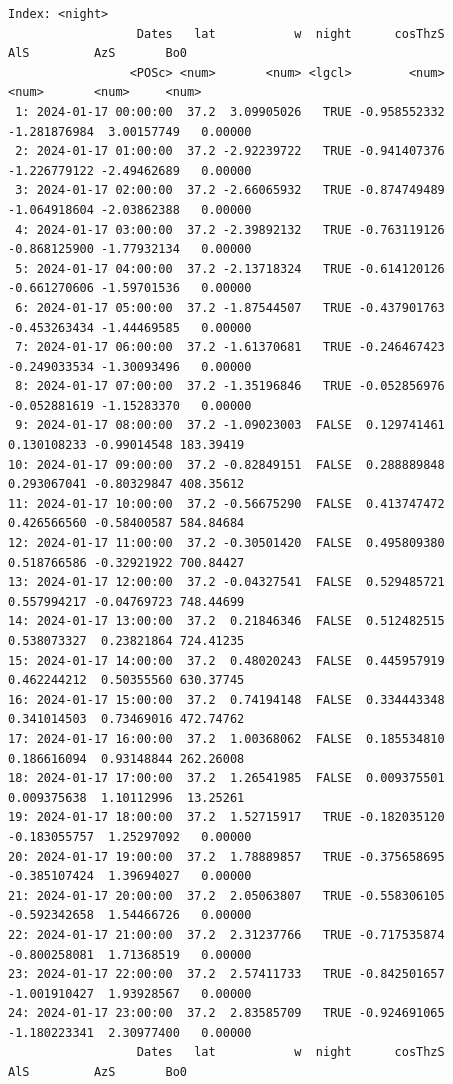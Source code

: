 \begin{verbatim}
Index: <night>
                  Dates   lat           w  night      cosThzS          AlS         AzS       Bo0
                 <POSc> <num>       <num> <lgcl>        <num>        <num>       <num>     <num>
 1: 2024-01-17 00:00:00  37.2  3.09905026   TRUE -0.958552332 -1.281876984  3.00157749   0.00000
 2: 2024-01-17 01:00:00  37.2 -2.92239722   TRUE -0.941407376 -1.226779122 -2.49462689   0.00000
 3: 2024-01-17 02:00:00  37.2 -2.66065932   TRUE -0.874749489 -1.064918604 -2.03862388   0.00000
 4: 2024-01-17 03:00:00  37.2 -2.39892132   TRUE -0.763119126 -0.868125900 -1.77932134   0.00000
 5: 2024-01-17 04:00:00  37.2 -2.13718324   TRUE -0.614120126 -0.661270606 -1.59701536   0.00000
 6: 2024-01-17 05:00:00  37.2 -1.87544507   TRUE -0.437901763 -0.453263434 -1.44469585   0.00000
 7: 2024-01-17 06:00:00  37.2 -1.61370681   TRUE -0.246467423 -0.249033534 -1.30093496   0.00000
 8: 2024-01-17 07:00:00  37.2 -1.35196846   TRUE -0.052856976 -0.052881619 -1.15283370   0.00000
 9: 2024-01-17 08:00:00  37.2 -1.09023003  FALSE  0.129741461  0.130108233 -0.99014548 183.39419
10: 2024-01-17 09:00:00  37.2 -0.82849151  FALSE  0.288889848  0.293067041 -0.80329847 408.35612
11: 2024-01-17 10:00:00  37.2 -0.56675290  FALSE  0.413747472  0.426566560 -0.58400587 584.84684
12: 2024-01-17 11:00:00  37.2 -0.30501420  FALSE  0.495809380  0.518766586 -0.32921922 700.84427
13: 2024-01-17 12:00:00  37.2 -0.04327541  FALSE  0.529485721  0.557994217 -0.04769723 748.44699
14: 2024-01-17 13:00:00  37.2  0.21846346  FALSE  0.512482515  0.538073327  0.23821864 724.41235
15: 2024-01-17 14:00:00  37.2  0.48020243  FALSE  0.445957919  0.462244212  0.50355560 630.37745
16: 2024-01-17 15:00:00  37.2  0.74194148  FALSE  0.334443348  0.341014503  0.73469016 472.74762
17: 2024-01-17 16:00:00  37.2  1.00368062  FALSE  0.185534810  0.186616094  0.93148844 262.26008
18: 2024-01-17 17:00:00  37.2  1.26541985  FALSE  0.009375501  0.009375638  1.10112996  13.25261
19: 2024-01-17 18:00:00  37.2  1.52715917   TRUE -0.182035120 -0.183055757  1.25297092   0.00000
20: 2024-01-17 19:00:00  37.2  1.78889857   TRUE -0.375658695 -0.385107424  1.39694027   0.00000
21: 2024-01-17 20:00:00  37.2  2.05063807   TRUE -0.558306105 -0.592342658  1.54466726   0.00000
22: 2024-01-17 21:00:00  37.2  2.31237766   TRUE -0.717535874 -0.800258081  1.71368519   0.00000
23: 2024-01-17 22:00:00  37.2  2.57411733   TRUE -0.842501657 -1.001910427  1.93928567   0.00000
24: 2024-01-17 23:00:00  37.2  2.83585709   TRUE -0.924691065 -1.180223341  2.30977400   0.00000
                  Dates   lat           w  night      cosThzS          AlS         AzS       Bo0
\end{verbatim}

